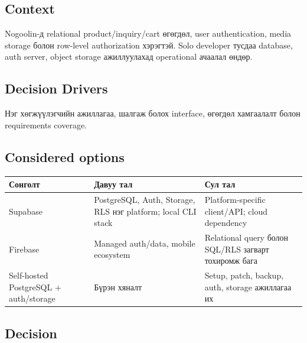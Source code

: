 \documentclass[
  mongolian,
]{article}
\begin{document}
\subsection{Context}\label{context-1}

Nogoolin-д relational product/inquiry/cart өгөгдөл, user authentication,
media storage болон row-level authorization хэрэгтэй. Solo developer
тусдаа database, auth server, object storage ажиллуулахад operational
ачаалал өндөр.

\subsection{Decision Drivers}\label{decision-drivers-1}

Нэг хөгжүүлэгчийн ажиллагаа, шалгаж болох interface, өгөгдөл хамгаалалт
болон requirements coverage.

\subsection{Considered options}\label{considered-options-1}

\begin{longtable}[]{@{}
  >{\raggedright\arraybackslash}p{}
  >{\raggedright\arraybackslash}p{}
  >{\raggedright\arraybackslash}p{}@{}}
\toprule\noalign{}
\begin{minipage}[b]{\linewidth}\raggedright
Сонголт
\end{minipage} & \begin{minipage}[b]{\linewidth}\raggedright
Давуу тал
\end{minipage} & \begin{minipage}[b]{\linewidth}\raggedright
Сул тал
\end{minipage} \\
\midrule\noalign{}
\endhead
\bottomrule\noalign{}
\endlastfoot
Supabase & PostgreSQL, Auth, Storage, RLS нэг platform; local CLI stack
& Platform-specific client/API; cloud dependency \\
Firebase & Managed auth/data, mobile ecosystem & Relational query болон
SQL/RLS загварт тохиромж бага \\
Self-hosted PostgreSQL + auth/storage & Бүрэн хяналт & Setup, patch,
backup, auth, storage ажиллагаа их \\
\end{longtable}

\subsection{Decision}\label{decision-1}
\end{document}
